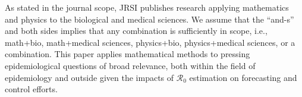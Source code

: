 \documentclass[12pt]{article}
\newcommand{\Ro}{\ensuremath{{\mathcal R}_{0}}\xspace}
\begin{document}
As stated in the journal scope, JRSI publishes research applying mathematics and physics to the biological and medical sciences. We assume that the ``and-s'' and both sides implies that any combination is sufficiently in scope, i.e., math+bio, math+medical sciences, physics+bio, physics+medical sciences, or a combination. This paper applies mathematical methods to pressing epidemiological questions of broad relevance, both within the field of epidemiology and outside given the impacts of $\Ro$ estimation on forecasting and control efforts.

\pagebreak


\end{document}
